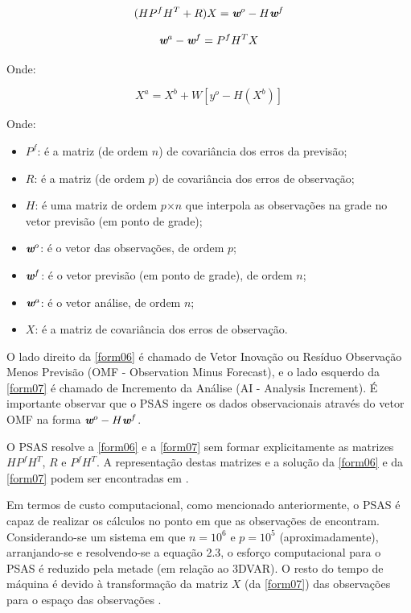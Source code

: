 \begin{equation}
(HP^{f}H^{T}+R)X=\textit{\textbf{w}}^o-H\textit{\textbf{w}}^f
\label{form06}
\end{equation}

\begin{equation}
\textit{\textbf{w}}^a-\textit{\textbf{w}}^f=P^{f}H^{T}X
\label{form07}
\end{equation}

Onde:

\begin{equation}
X^{a}=X^{b}+W[y^{o}-H(X^{b})]
\label{form08}
\end{equation}

Onde:

\begin{itemize}
\item $P^{f}$: é a matriz (de ordem $n$) de covariância dos erros da previsão;
\item $R$: é a matriz (de ordem $p$) de covariância dos erros de observação;
\item $H$: é uma matriz de ordem $p$$\times$$n$ que interpola as observações na grade no vetor previsão (em ponto de grade);
\item $\textit{\textbf{w}}^o$: é o vetor das observações, de ordem $p$;
\item $\textit{\textbf{w}}^f$: é o vetor previsão (em ponto de grade), de ordem $n$;
\item $\textit{\textbf{w}}^a$: é o vetor análise, de ordem $n$;
\item $\textit{X}$: é a matriz de covariância dos erros de observação.
\end{itemize}

O lado direito da \autoref{form06} é chamado de Vetor Inovação ou Resíduo Observação Menos Previsão (OMF - Observation Minus Forecast), e o lado esquerdo da \autoref{form07} é chamado de Incremento da Análise (AI - Analysis Increment). É importante observar que o PSAS ingere os dados observacionais através do vetor OMF na forma $\textit{\textbf{w}}^o-H\textit{\textbf{w}}^f$.

O PSAS resolve a \autoref{form06} e a \autoref{form07} sem formar explicitamente as matrizes $HP^{f}H^{T}$, $R$ e $P^{f}H^{T}$. A representação destas matrizes e a solução da \autoref{form06} e da \autoref{form07} podem ser encontradas em \cite{guoetal98}.

Em termos de custo computacional, como mencionado anteriormente, o PSAS é capaz de realizar os cálculos no ponto em que as observações de encontram. Considerando-se um sistema em que $n=10^{6}$ e $p=10^{5}$ (aproximadamente), arranjando-se e resolvendo-se a equação 2.3, o esforço computacional para o PSAS é reduzido pela metade (em relação ao 3DVAR). O resto do tempo de máquina é devido à transformação da matriz $X$ (da \autoref{form07}) das observações para o espaço das observações \cite{cohnetal98}.

